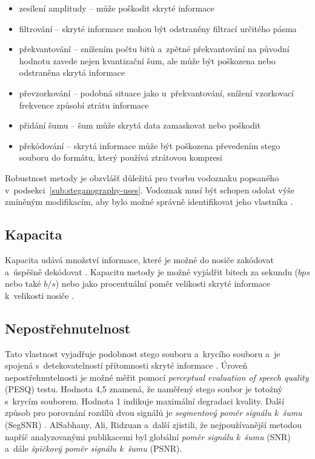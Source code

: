 \begin{itemize}
    \item zesílení amplitudy -- může poškodit skryté informace
    \item filtrování -- skryté informace mohou být odstraněny filtrací určitého
        pásma
    \item překvantování -- snížením počtu bitů a~zpětné překvantování na
        původní hodnotu zavede nejen kvantizační šum, ale může být poškozena
        nebo odstraněna skrytá informace
    \item převzorkování -- podobná situace jako u~překvantování, snížení
        vzorkovací frekvence způsobí ztrátu informace
    \item přidání šumu -- šum může skrytá data zamaskovat nebo poškodit
    \item překódování -- skrytá informace může být poškozena převedením stego
        souboru do formátu, který používá ztrátovou kompresi
\end{itemize}

Robustnost metody je obzvlášť důležitá pro tvorbu vodoznaku popsaného
v~podsekci~\ref{sub:steganography-uses}. Vodoznak musí být schopen odolat výše
zmíněným modifikacím, aby bylo možné správně identifikovat jeho vlastníka
\cite{Swanson1998}.

\subsection*{Kapacita}
\label{sub:capacity}

Kapacita udává množství informace, které je možné do nosiče zakódovat a~úspěšně
dekódovat \cite{Dutta2020}\cite{Djebbar2012}. Kapacitu metody je možné vyjádřit
bitech za sekundu ($bps$ nebo také $b/s$) nebo jako procentuální poměr
velikosti skryté informace k~velikosti nosiče
\cite{AlSabhany2020}\cite{Dutta2020}.

\subsection*{Nepostřehnutelnost}
\label{sub:imperceptibility}

Tato vlastnost vyjadřuje podobnost stego souboru a~krycího souboru a~je spojená
s~detekovatelností přítomnosti skryté informace \cite{AlSabhany2020}. Úroveň
nepostřehnutelnosti je možné měřit pomocí \textit{perceptual evaluation of
speech quality} (PESQ) testu. Hodnota 4,5 znamená, že naměřený stego soubor je
totožný s~krycím souborem. Hodnota 1 indikuje maximální degradaci kvality.
Další způsob pro porovnání rozdílů dvou signálů je \textit{segmentový poměr
signálu k~šumu} (SegSNR) \cite{Djebbar2012}. AlSabhany, Ali, Ridzuan a~další
\cite{AlSabhany2020} zjistili, že nejpoužívanější metodou napříč analyzovanými
publikacemi byl globální \textit{poměr signálu k~šumu} (SNR) a~dále
\textit{špičkový poměr signálu k~šumu} (PSNR).

